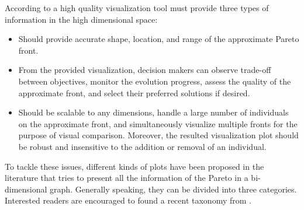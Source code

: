According to \citet{Gao2019} a high quality visualization tool must provide three types of information in the high dimensional space: 
\begin{itemize}
\item  Should provide accurate shape, location, and range of the approximate Pareto front. 
\item  From the provided visualization, decision makers can observe trade-off between objectives, monitor the evolution progress, assess the quality of the approximate front, and select their preferred solutions if desired. 
\item  Should be scalable to any dimensions, handle a large number of individuals on the approximate front, and simultaneously visualize multiple fronts for the purpose of visual comparison. Moreover, the resulted visualization plot should be robust and insensitive to the addition or removal of an individual.
\end{itemize}

To tackle these issues, different kinds of plots have been proposed in the literature that tries to present all the information of the Pareto in a bi-dimensional graph. Generally speaking, they can be divided into three categories. Interested readers are encouraged to found a recent taxonomy from \citet{B.2018}.

